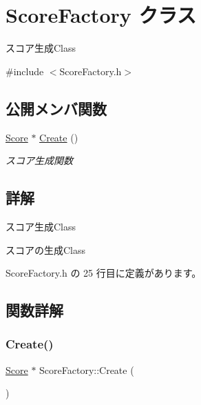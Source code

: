 \hypertarget{class_score_factory}{}\section{Score\+Factory クラス}
\label{class_score_factory}


スコア生成\+Class  




{\ttfamily \#include $<$Score\+Factory.\+h$>$}

\subsection*{公開メンバ関数}
\begin{DoxyCompactItemize}
\item 
\mbox{\hyperlink{class_score}{Score}} $\ast$ \mbox{\hyperlink{class_score_factory_a121d4d8e19faeac1d37b706cedb6fd03}{Create}} ()
\begin{DoxyCompactList}\small\item\em スコア生成関数 \end{DoxyCompactList}\end{DoxyCompactItemize}


\subsection{詳解}
スコア生成\+Class 

スコアの生成\+Class 

 Score\+Factory.\+h の 25 行目に定義があります。



\subsection{関数詳解}
\mbox{\label{class_score_factory_a121d4d8e19faeac1d37b706cedb6fd03}} 
\subsubsection{\texorpdfstring{Create()}{Create()}}
{\footnotesize\ttfamily \mbox{\hyperlink{class_score}{Score}} $\ast$ Score\+Factory\+::\+Create (\begin{DoxyParamCaption}{ }\end{DoxyParamCaption})}



